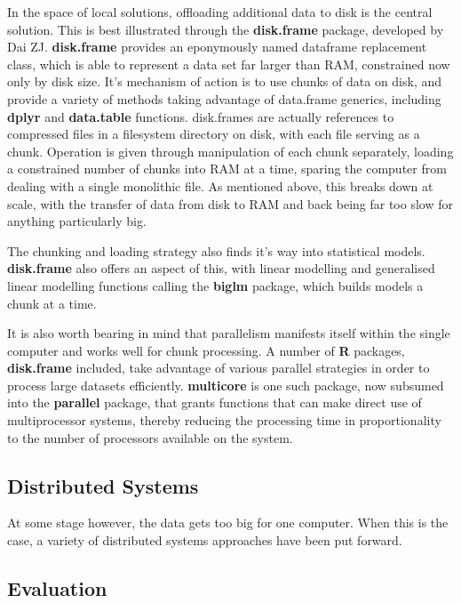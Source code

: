 In the space of local solutions, offloading additional data to disk is the central solution.
This is best illustrated through the \textbf{disk.frame} package, developed by Dai ZJ.
\textbf{disk.frame} provides an eponymously named dataframe replacement class, which is able to represent a data  set far larger than RAM, constrained now only by disk size\cite{zj20}.
It's mechanism of action is to use chunks of data on disk, and provide a variety of methods taking advantage of data.frame generics, including \textbf{dplyr} and \textbf{data.table} functions.
disk.frames are actually references to compressed files in a filesystem directory on disk, with each file serving as a chunk.
Operation is given through manipulation of each chunk separately, loading a constrained number of chunks into RAM at a time, sparing the computer from dealing with a single monolithic file\cite{zj19:_inges_data}.
As mentioned above, this breaks down at scale, with the transfer of data from disk to RAM and back being far too slow for anything particularly big.

The chunking and loading strategy also finds it's way into statistical models.
\textbf{disk.frame} also offers an aspect of this, with linear modelling and generalised linear modelling functions calling the \textbf{biglm} package, which builds models a chunk at a time.

It is also worth bearing in mind that parallelism manifests itself within the single computer and works well for chunk processing.
A number of \textbf{R} packages, \textbf{disk.frame} included, take advantage of various parallel strategies in order to process large datasets efficiently.
\textbf{multicore} is one such package, now subsumed into the \textbf{parallel} package, that grants functions that can make direct use of multiprocessor systems, thereby reducing the processing time in proportionality to the number of processors available on the system.

\subsection{Distributed Systems}

At some stage however, the data gets too big for one computer.
When this is the case, a variety of distributed systems approaches have been put forward.

\subsection{Evaluation}
